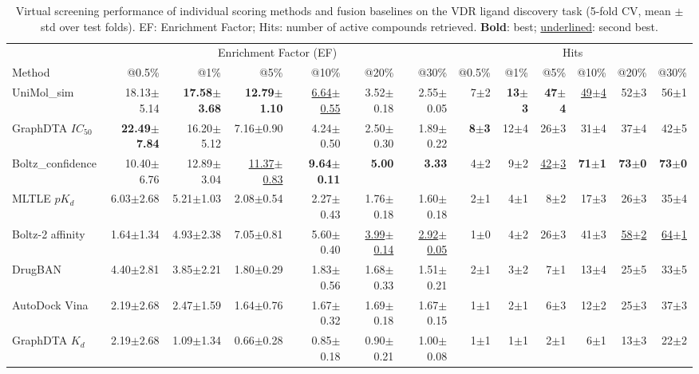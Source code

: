 \begin{table}[htbp!]
\centering
\caption{Virtual screening performance of individual scoring methods and fusion baselines on the VDR ligand discovery task (5-fold CV, mean $\pm$ std over test folds). EF: Enrichment Factor; Hits: number of active compounds retrieved. \textbf{Bold}: best; \underline{underlined}: second best.}
\label{tab:fusion_performance}
\small
\begin{tabular}{lrrrrrr|rrrrrr}
\toprule
& \multicolumn{6}{c|}{Enrichment Factor (EF)} & \multicolumn{6}{c}{Hits} \\
Method & @0.5\% & @1\% & @5\% & @10\% & @20\% & @30\% & @0.5\% & @1\% & @5\% & @10\% & @20\% & @30\% \\
\midrule
UniMol_sim & 18.13$\pm$5.14 & \textbf{17.58$\pm$3.68} & \textbf{12.79$\pm$1.10} & \underline{6.64$\pm$0.55} & 3.52$\pm$0.18 & 2.55$\pm$0.05 & 7$\pm$2 & \textbf{13$\pm$3} & \textbf{47$\pm$4} & \underline{49$\pm$4} & 52$\pm$3 & 56$\pm$1 \\
GraphDTA $IC_{50}$ & \textbf{22.49$\pm$7.84} & 16.20$\pm$5.12 & 7.16$\pm$0.90 & 4.24$\pm$0.50 & 2.50$\pm$0.30 & 1.89$\pm$0.22 & \textbf{8$\pm$3} & 12$\pm$4 & 26$\pm$3 & 31$\pm$4 & 37$\pm$4 & 42$\pm$5 \\
Boltz_confidence & 10.40$\pm$6.76 & 12.89$\pm$3.04 & \underline{11.37$\pm$0.83} & \textbf{9.64$\pm$0.11} & \textbf{5.00} & \textbf{3.33} & 4$\pm$2 & 9$\pm$2 & \underline{42$\pm$3} & \textbf{71$\pm$1} & \textbf{73$\pm$0} & \textbf{73$\pm$0} \\
MLTLE $pK_d$ & 6.03$\pm$2.68 & 5.21$\pm$1.03 & 2.08$\pm$0.54 & 2.27$\pm$0.43 & 1.76$\pm$0.18 & 1.60$\pm$0.18 & 2$\pm$1 & 4$\pm$1 & 8$\pm$2 & 17$\pm$3 & 26$\pm$3 & 35$\pm$4 \\
Boltz-2 affinity & 1.64$\pm$1.34 & 4.93$\pm$2.38 & 7.05$\pm$0.81 & 5.60$\pm$0.40 & \underline{3.99$\pm$0.14} & \underline{2.92$\pm$0.05} & 1$\pm$0 & 4$\pm$2 & 26$\pm$3 & 41$\pm$3 & \underline{58$\pm$2} & \underline{64$\pm$1} \\
DrugBAN & 4.40$\pm$2.81 & 3.85$\pm$2.21 & 1.80$\pm$0.29 & 1.83$\pm$0.56 & 1.68$\pm$0.33 & 1.51$\pm$0.21 & 2$\pm$1 & 3$\pm$2 & 7$\pm$1 & 13$\pm$4 & 25$\pm$5 & 33$\pm$5 \\
AutoDock Vina & 2.19$\pm$2.68 & 2.47$\pm$1.59 & 1.64$\pm$0.76 & 1.67$\pm$0.32 & 1.69$\pm$0.18 & 1.67$\pm$0.15 & 1$\pm$1 & 2$\pm$1 & 6$\pm$3 & 12$\pm$2 & 25$\pm$3 & 37$\pm$3 \\
GraphDTA $K_{d}$ & 2.19$\pm$2.68 & 1.09$\pm$1.34 & 0.66$\pm$0.28 & 0.85$\pm$0.18 & 0.90$\pm$0.21 & 1.00$\pm$0.08 & 1$\pm$1 & 1$\pm$1 & 2$\pm$1 & 6$\pm$1 & 13$\pm$3 & 22$\pm$2 \\

\end{tabular}
\end{table}
